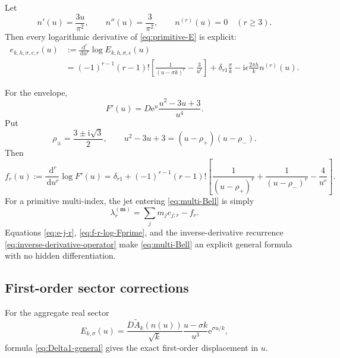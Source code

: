 \documentclass[11pt]{article}
\numberwithin{equation}{section}
\theoremstyle{mainthm}
\theoremstyle{defstyle}
\theoremstyle{remark}
\newcommand{\e}{\mathrm e}
\newcommand{\ii}{\mathrm i}
\newcommand{\dd}{\,\mathrm d}
\begin{document}
Let
\begin{equation}\label{eq:n-derivatives}
 n'(u)=\frac{3u}{\pi^2},
 \qquad n''(u)=\frac3{\pi^2},
 \qquad n^{(r)}(u)=0\quad(r\ge3).
\end{equation}
Then every logarithmic derivative of \eqref{eq:primitive-E} is explicit:
\begin{equation}\label{eq:e-j-r}
 \boxed{
 \begin{aligned}
 e_{k,h,\sigma,\epsilon;r}(u)
 &:=\frac{\dd^r}{\dd u^r}\log E_{k,h,\sigma,\epsilon}(u)\\
 &=(-1)^{r-1}(r-1)!
 \left[\frac1{(u-\sigma k)^r}-\frac3{u^r}\right]
 +\delta_{r1}\frac\sigma k
 -\ii\epsilon\frac{2\pi h}{k}n^{(r)}(u).
 \end{aligned}}
\end{equation}

For the envelope,
\begin{equation}\label{eq:F-prime}
 F'(u)=D\e^u\frac{u^2-3u+3}{u^4}.
\end{equation}
Put
\begin{equation}\label{eq:rho-pm}
 \rho_\pm=\frac{3\pm\ii\sqrt3}{2},
 \qquad u^2-3u+3=(u-\rho_+)(u-\rho_-).
\end{equation}
Then
\begin{equation}\label{eq:f-r-log-Fprime}
 \boxed{
 f_r(u):=\frac{\dd^r}{\dd u^r}\log F'(u)
 =\delta_{r1}+(-1)^{r-1}(r-1)!
 \left[
 \frac1{(u-\rho_+)^r}+\frac1{(u-\rho_-)^r}-\frac4{u^r}
 \right].}
\end{equation}
For a primitive multi-index, the jet entering \eqref{eq:multi-Bell} is simply
\begin{equation}\label{eq:lambda-explicit}
 \lambda_r^{(\bm m)}
 =\sum_jm_je_{j;r}-f_r.
\end{equation}
Equations \eqref{eq:e-j-r}, \eqref{eq:f-r-log-Fprime}, and the inverse-derivative recurrence \eqref{eq:inverse-derivative-operator} make \eqref{eq:multi-Bell} an explicit general formula with no hidden differentiation.

\subsection{First-order sector corrections}

For the aggregate real sector
\begin{equation}\label{eq:E-aggregate-u}
 E_{k,\sigma}(u)=
 \frac{D\widetilde A_k(n(u))}{\sqrt{k}}
 \frac{u-\sigma k}{u^3}\e^{\sigma u/k},
\end{equation}
formula \eqref{eq:Delta1-general} gives the exact first-order displacement in \(u\).
\end{document}
